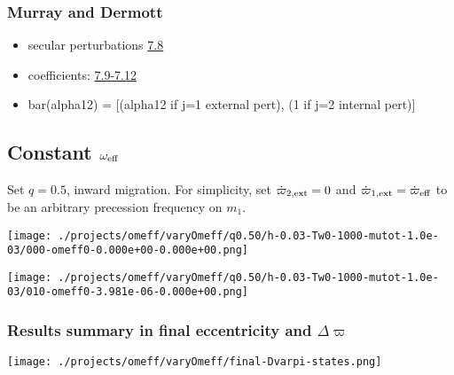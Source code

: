 \documentclass[11pt]{article}
\begin{document}
\subsubsection{Murray and Dermott}
\label{sec:orgc92aca6}
\begin{itemize}
\item secular perturbations \href{./images/screenshot-02.png}{7.8}
\item coefficients: \href{./images/screenshot-03.png}{7.9-7.12}
\item bar(alpha12) = [(alpha12 if j=1 external pert),  (1 if j=2 internal pert)]
\end{itemize}

\subsection{Constant \(\omega_{\rm eff}\)}
\label{sec:org61d6393}
Set \(q=0.5\), inward migration. For simplicity, set \(\dot\varpi_{2,\rm
ext} = 0\) and \(\dot\varpi_{1,\rm ext}=\dot\varpi_{\rm eff}\) to be an
arbitrary precession frequency on \(m_1\).

\begin{center}
\texttt{[image: ./projects/omeff/varyOmeff/q0.50/h-0.03-Tw0-1000-mutot-1.0e-03/000-omeff0-0.000e+00-0.000e+00.png]}
\end{center}

\begin{center}
\texttt{[image: ./projects/omeff/varyOmeff/q0.50/h-0.03-Tw0-1000-mutot-1.0e-03/010-omeff0-3.981e-06-0.000e+00.png]}
\end{center}

\subsubsection{Results summary in final eccentricity and \(\Delta\varpi\)}
\label{sec:org2e3bda7}
\begin{center}
\texttt{[image: ./projects/omeff/varyOmeff/final-Dvarpi-states.png]}
\end{center}
\end{document}
